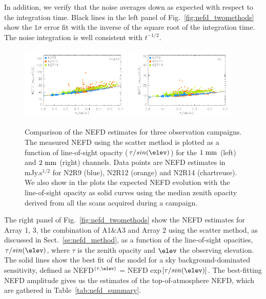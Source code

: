 In addition, we verify that the noise averages down as expected with
respect to the integration time. Black lines in the left panel of
Fig.~\ref{fig:nefd_twomethods} show the $1\sigma$ error fit with the
inverse of the square root of the integration time. The noise
integration is well consistent with $t^{-1/2}$.

\begin{figure}[!thbp]
\begin{center}
\includegraphics[clip=true,width=0.47\textwidth]{Figures/plot_nefd_vs_obstau_corrected_skydip_vfinal_1mm.pdf}
\includegraphics[clip=true,width=0.47\textwidth]{Figures/plot_nefd_vs_obstau_corrected_skydip_vfinal_a2.pdf}
\caption{Comparison of the NEFD estimates for three observation
  campaigns. The measured NEFD using the scatter method is plotted as a function of
  line-of-sight opacity ($\tau/sin(\elev)$) for the $1~\rm{mm}$ (left) and $2~\rm{mm}$ (right)
  channels. Data points are NEFD estimates in mJy.s$^{1/2}$ for N2R9 (blue), N2R12 (orange)
  and N2R14 (chartreuse). We also show in the plots the expected NEFD evolution
  with the line-of-sight opacity as solid curves using the median
  zenith opacity derived from all the scans acquired during a campaign.}
\label{fig:nefdvsbackground_below_1Jy}
\end{center}
\end{figure}

The right panel of Fig.~\ref{fig:nefd_twomethods} show the NEFD
estimates for  Array 1, 3, the combination of A1$\&$A3 and Array 2
using the scatter method, as discussed in Sect.~\ref{se:nefd_method},
as a function of the line-of-sight opacities, $\tau/sin(\elev)$,
where $\tau$ is the zenith opacity and $\elev$ the observing
elevation. The solid lines show the best fit of the model for a sky
background-dominated sensitivity,
defined as NEFD$^{(\tau, \elev)}$ = NEFD exp${[\tau/sin(\elev)]}$. The
best-fitting NEFD amplitude gives us the estimates of the
top-of-atmosphere NEFD, which are gathered in
Table~\ref{tab:nefd_summary}.

